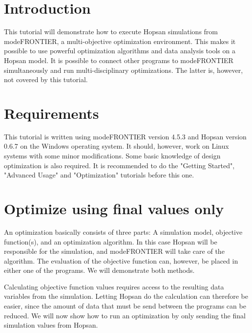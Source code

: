 \documentclass[a4paper]{article}
\begin{document}


\section*{Introduction}
This tutorial will demonstrate how to execute Hopsan simulations from modeFRONTIER, a multi-objective optimization environment. This makes it possible to use powerful optimization algorithms and data analysis tools on a Hopsan model. It is possible to connect other programs to modeFRONTIER simultaneously and run multi-disciplinary optimizations. The latter is, however, not covered by this tutorial.

\section*{Requirements}
This tutorial is written using modeFRONTIER version 4.5.3 and Hopsan version 0.6.7 on the Windows operating system. It should, however, work on Linux systems with some minor modifications. Some basic knowledge of design optimization is also required. It is recommended to do the "Getting Started", "Advanced Usage" and "Optimization" tutorials before this one.

\section*{Optimize using final values only}
An optimization basically consists of three parts: A simulation model, objective function(s), and an optimization algorithm. In this case Hopsan will be responsible for the simulation, and modeFRONTIER will take care of the algorithm. The evaluation of the objective function can, however, be placed in either one of the programs. We will demonstrate both methods.

Calculating objective function values requires access to the resulting data variables from the simulation. Letting Hopsan do the calculation can therefore be easier, since the amount of data that must be send between the programs can be reduced. We will now show how to run an optimization by only sending the final simulation values from Hopsan.
\end{document}
